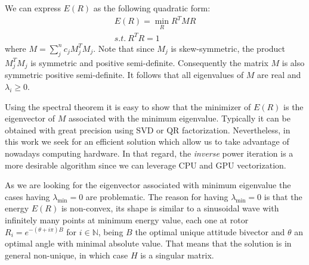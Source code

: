 \documentclass{birkjour}
\numberwithin{equation}{section}
\begin{document}
We can express $E(R)$ as the following quadratic form:
\begin{eqnarray*}
E(R) = \min_R R^T M R\\
s.t. \ R^T R = 1
\end{eqnarray*}
where $M = \sum_j^n { c_j M_j^T M_j}$. Note that since $M_j$ is skew-symmetric, the product $M_j^T M_j$ is symmetric and positive semi-definite.
Consequently the matrix $M$ is also symmetric positive semi-definite. It follows that all eigenvalues of $M$ are real and $\lambda_i \geq 0$.

Using the spectral theorem it is easy to show that the minimizer of $E(R)$ is the eigenvector of $M$ associated with the minimum eigenvalue.
Typically it can be obtained with great precision using SVD or QR factorization.
Nevertheless, in this work we seek for an efficient solution which allow us to take advantage of nowadays computing hardware.
In that regard, the \emph{inverse} power iteration is a more desirable algorithm since we can leverage CPU and GPU vectorization.

As we are looking for the eigenvector associated with minimum eigenvalue the cases having $\lambda_{\min} = 0$ are problematic.
The reason for having $\lambda_{\min} = 0$ is that the energy $E(R)$ is non-convex, its shape is similar to a sinusoidal wave with 
infinitely many points at minimum energy value, each one at rotor $R_i = e^{-(\theta + i \pi) B}$ for $i \in \mathbb N$, being $B$ the 
optimal unique attitude bivector and $\theta $ an optimal angle with minimal absolute value.
That means that the solution is in general non-unique, in which case $H$ is a singular matrix.
\end{document}
